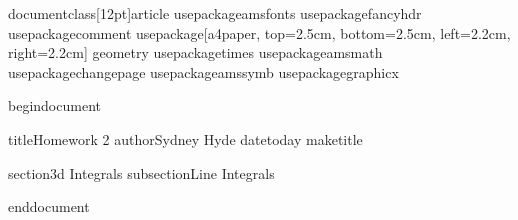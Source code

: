 documentclass[12pt]{article}%
usepackage{amsfonts}
usepackage{fancyhdr}
usepackage{comment}
usepackage[a4paper, top=2.5cm, bottom=2.5cm, left=2.2cm, right=2.2cm]%
{geometry}
usepackage{times}
usepackage{amsmath}
usepackage{changepage}
usepackage{amssymb}
usepackage{graphicx}%

begin{document}

title{Homework 2}
author{Sydney Hyde}
date{today}
maketitle

section{3d Integrals}
subsection{Line Integrals} 

end{document}
